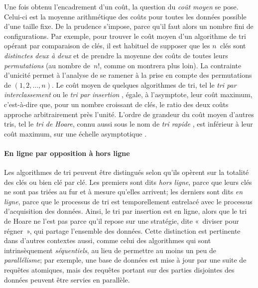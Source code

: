 Une fois obtenu l'encadrement d'un coût, la question du \emph{coût
  moyen} \citep{VitterFlajolet_1990} \citep[\S{}1.2.10]{Knuth_1997} se
pose. Celui-ci est la moyenne arithmétique des coûts pour toutes les
données possible d'une taille fixe. De la prudence s'impose, parce
qu'il faut alors un nombre fini de configurations. Par exemple, pour
trouver le coût moyen d'un algorithme de tri opérant par comparaison
de clés, il est habituel de supposer que les \(n\)~clés sont
\emph{distinctes deux à deux} et de prendre la
moyenne des coûts de toutes leurs
\emph{permutations} (au nombre de~\(n!\), comme on
montrera plus loin). La contrainte d'unicité permet à l'analyse de se
ramener à la prise en compte des permutations de \((1,2,\dots,n)\). Le
coût moyen de quelques algorithmes de tri, tel le \emph{tri par
  interclassement} \cite[\S{}5.2.4]{Knuth_1998}
\cite[\S{}2.3]{CLRS_2009} ou le \emph{tri par insertion}
\cite[\S{}5.2.1]{Knuth_1998} \cite[\S{}2.1]{CLRS_2009}, égale, à
l'asymptote, leur coût maximum, c'est-à-dire que, pour un nombre
croissant de clés, le ratio des deux coûts approche arbitrairement
près l'unité. L'ordre de grandeur du
coût moyen d'autres tris, tel le \emph{tri de Hoare}, connu aussi sous
le nom de \emph{tri rapide} \cite[\S{}5.2.2]{Knuth_1998}
\cite[\S{}7]{CLRS_2009}, est inférieur à leur coût maximum, sur une
échelle asymptotique \cite[\S{}9]{GrahamKnuthPatashnik_1994}.

\paragraph{En ligne par opposition à hors ligne}
\label{par:online_vs_offline}

Les algorithmes de tri peuvent être distingués selon qu'ils opèrent
sur la totalité des clés ou bien clé par clé. Les premiers sont dits
\emph{hors ligne}, parce que leurs clés
ne sont pas triées au fur et à mesure qu'elles arrivent; les derniers
sont dits \emph{en ligne}, parce que le
processus de tri est temporellement entrelacé avec le processus
d'acquisition des données. Ainsi, le tri par insertion est en ligne,
alors que le tri de Hoare ne l'est pas parce qu'il repose sur une
stratégie, dite «~diviser pour régner~», qui partage l'ensemble des
données. Cette distinction est pertinente dans d'autres contextes
aussi, comme celui des algorithmes qui sont intrinsèquement
\emph{séquentiels}, au lieu de permettre au moins un peu de
\emph{parallélisme}; par exemple, une base de données est mise à jour
par une suite de requêtes atomiques, mais des requêtes portant sur des
parties disjointes des données peuvent être servies en parallèle.


